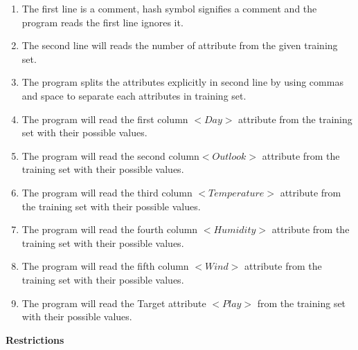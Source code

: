 \documentclass{report}
\begin{document}
\begin{enumerate}



\item The first line is a comment, hash symbol signifies a comment and the program reads the first line ignores it. 
\item The second line will reads the number of attribute from the given training set.
\item The program splits the attributes explicitly in second line by using commas and space to separate each attributes in training set. 
\item The program will read the first column $<Day>$ attribute from the training set with their possible values.
\item The program will read the second column$<Outlook>$ attribute from the training set with their possible values.
\item The program will read the third column $<Temperature>$ attribute from the training set with their possible values.
\item The program will read the fourth column $<Humidity>$ attribute from the training set with their possible values.
\item The program will read the fifth column $<Wind>$ attribute from the training set with their possible values. 
\item The program will read the Target attribute $<Play>$ from the training set with their possible values.

\end{enumerate}

{\bf Restrictions}
\end{document}
